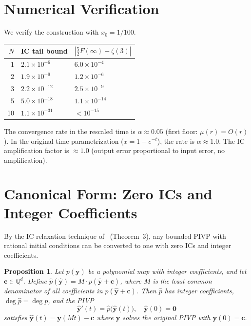 \documentclass[11pt]{article}
\newtheorem{proposition}[theorem]{Proposition}
\newcommand{\Q}{\mathbb{Q}}
\begin{document}
\section{Numerical Verification}

We verify the construction with $x_0 = 1/100$.

\medskip
\begin{center}
\begin{tabular}{rll}
\hline
$N$ & IC tail bound & $|\frac{5}{2}F(\infty) - \zeta(3)|$ \\
\hline
1 & $2.1 \times 10^{-6}$ & $6.0 \times 10^{-4}$ \\
2 & $1.9 \times 10^{-9}$ & $1.2 \times 10^{-6}$ \\
3 & $2.2 \times 10^{-12}$ & $2.5 \times 10^{-9}$ \\
5 & $5.0 \times 10^{-18}$ & $1.1 \times 10^{-14}$ \\
10 & $1.1 \times 10^{-31}$ & $< 10^{-15}$ \\
\hline
\end{tabular}
\end{center}

\medskip\noindent
The convergence rate in the rescaled time is $\alpha \approx 0.05$
(first floor: $\mu(r) = O(r)$). In the original time parametrization
($x = 1 - e^{-t}$), the rate is $\alpha \approx 1.0$.
The IC amplification factor is $\approx 1.0$
(output error proportional to input error, no amplification).

\section{Canonical Form: Zero ICs and Integer Coefficients}

By the IC relaxation technique of~\cite{RTCRN2} (Theorem~3),
any bounded PIVP with rational initial conditions can be converted
to one with zero ICs and integer coefficients.

\begin{proposition}\label{prop:shift}
Let $p(\mathbf{y})$ be a polynomial map with integer coefficients,
and let $\mathbf{c} \in \Q^d$.
Define $\hat{p}(\hat{\mathbf{y}}) = M \cdot p(\hat{\mathbf{y}} + \mathbf{c})$,
where $M$ is the least common denominator of all coefficients in $p(\hat{\mathbf{y}} + \mathbf{c})$.
Then $\hat{p}$ has integer coefficients, $\deg \hat{p} = \deg p$,
and the PIVP
\[
  \hat{\mathbf{y}}'(t) = \hat{p}\bigl(\hat{\mathbf{y}}(t)\bigr), \quad \hat{\mathbf{y}}(0) = \mathbf{0}
\]
satisfies $\hat{\mathbf{y}}(t) = \mathbf{y}(Mt) - \mathbf{c}$
where $\mathbf{y}$ solves the original PIVP with $\mathbf{y}(0) = \mathbf{c}$.
\end{proposition}
\end{document}
